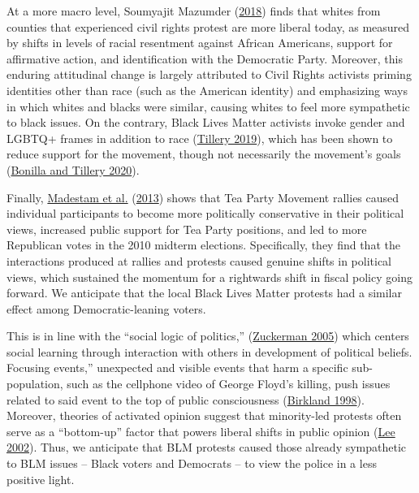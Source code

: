 \documentclass[
  12pt,
]{article}
\begin{document}
At a more macro level, Soumyajit Mazumder (\protect\hyperlink{ref-Mazumder2018}{2018}) finds that whites from counties that experienced civil rights protest are more liberal today, as measured by shifts in levels of racial resentment against African Americans, support for affirmative action, and identification with the Democratic Party. Moreover, this enduring attitudinal change is largely attributed to Civil Rights activists priming identities other than race (such as the American identity) and emphasizing ways in which whites and blacks were similar, causing whites to feel more sympathetic to black issues. On the contrary, Black Lives Matter activists invoke gender and LGBTQ+ frames in addition to race (\protect\hyperlink{ref-Tillery2019}{Tillery 2019}), which has been shown to reduce support for the movement, though not necessarily the movement's goals (\protect\hyperlink{ref-Bonilla2020}{Bonilla and Tillery 2020}).

Finally, \protect\hyperlink{ref-Madestam2013}{Madestam et al.} (\protect\hyperlink{ref-Madestam2013}{2013}) shows that Tea Party Movement rallies caused individual participants to become more politically conservative in their political views, increased public support for Tea Party positions, and led to more Republican votes in the 2010 midterm elections. Specifically, they find that the interactions produced at rallies and protests caused genuine shifts in political views, which sustained the momentum for a rightwards shift in fiscal policy going forward. We anticipate that the local Black Lives Matter protests had a similar effect among Democratic-leaning voters.

This is in line with the ``social logic of politics,'' (\protect\hyperlink{ref-Zuckerman2005}{Zuckerman 2005}) which centers social learning through interaction with others in development of political beliefs. Focusing events,'' unexpected and visible events that harm a specific sub-population, such as the cellphone video of George Floyd's killing, push issues related to said event to the top of public consciousness (\protect\hyperlink{ref-Birkland1998}{Birkland 1998}). Moreover, theories of activated opinion suggest that minority-led protests often serve as a ``bottom-up'' factor that powers liberal shifts in public opinion (\protect\hyperlink{ref-Lee2002}{Lee 2002}). Thus, we anticipate that BLM protests caused those already sympathetic to BLM issues -- Black voters and Democrats -- to view the police in a less positive light.
\end{document}
